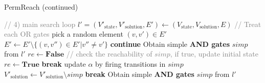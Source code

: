 \clearpage

\begin{algorithm}
  \caption{PermReach (continued)}
  \begin{algorithmic}
\State \textcolor{gray}{// 4) main search loop} %
    \State $l'=(V'_{\mathrm{state}}, V'_{\mathrm{solution}},E')\gets(V_{\mathrm{state}}, V_{\mathrm{solution}},E)$
     \textcolor{gray}{// Treat each OR gates}
        \State pick a random element $(v,v') \in E'$
        \State $E'\gets E' \setminus  \{(v,v'') \in E'| v''\neq v'\}$
    \EndFor
        \State \textbf{continue}
    \EndIf
    \State Obtain simple \textbf{AND gates} $simp$ from $l'$
        \State $re\gets\mathbf{False}$ \textcolor{gray}{// check the reachability of $simp$, if true, update initial state}
                \State $re\gets\mathbf{True}$
                \State \textbf{break}
            \EndIf
        \EndFor
            \State update $\alpha$ by firing transitions in $simp$
            \State $V'_{\mathrm{solution}}\gets V'_{\mathrm{solution}} \setminus simp$
        \Else
            \State \textbf{break}
        \EndIf
        \State Obtain simple \textbf{AND gates} $simp$ from $l'$
    \EndWhile
    \EndIf
\EndFor %
\State {}
  \end{algorithmic}
\end{algorithm}

